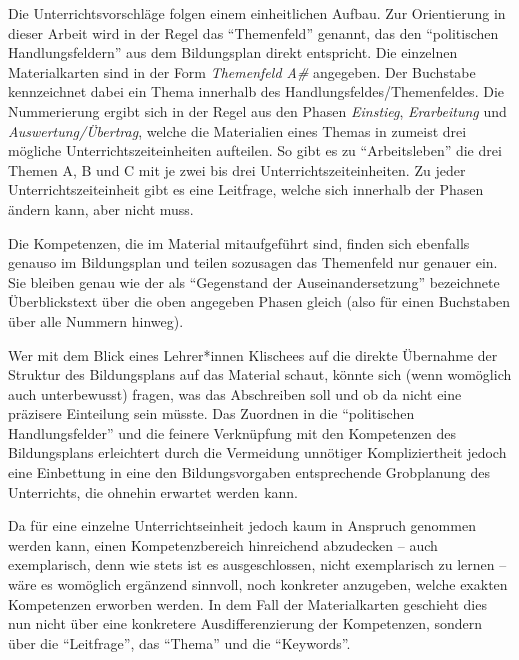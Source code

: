 Die Unterrichtsvorschläge folgen einem einheitlichen Aufbau. Zur Orientierung in dieser Arbeit wird in der Regel das \enquote{Themenfeld} genannt, das den \enquote{politischen Handlungsfeldern} aus dem Bildungsplan direkt entspricht. 
Die einzelnen Materialkarten sind in der Form \emph{Themenfeld A\#} angegeben. 
Der Buchstabe kennzeichnet dabei ein Thema innerhalb des Handlungsfeldes/Themenfeldes.
Die Nummerierung ergibt sich in der Regel aus den Phasen \emph{Einstieg}, \emph{Erarbeitung} und \emph{Auswertung/Übertrag}, welche die Materialien eines Themas in zumeist drei mögliche Unterrichtszeiteinheiten aufteilen. So gibt es zu \enquote{Arbeitsleben} die drei Themen A, B und C mit je zwei bis drei Unterrichtszeiteinheiten.
Zu jeder Unterrichtszeiteinheit gibt es eine Leitfrage, welche sich innerhalb der Phasen ändern kann, aber nicht muss. 

Die Kompetenzen, die im Material mitaufgeführt sind, finden sich ebenfalls genauso im Bildungsplan und teilen sozusagen das Themenfeld nur genauer ein. Sie bleiben genau wie der als \enquote{Gegenstand der Auseinandersetzung} bezeichnete Überblickstext über die oben angegeben Phasen gleich (also für einen Buchstaben über alle Nummern hinweg). 



Wer mit dem Blick eines Lehrer*innen Klischees auf die direkte Übernahme der Struktur des Bildungsplans auf das Material schaut, könnte sich (wenn womöglich auch unterbewusst) fragen, was das Abschreiben soll und ob da nicht eine präzisere Einteilung sein müsste.
Das Zuordnen in die \enquote{politischen Handlungsfelder} und die feinere Verknüpfung mit den Kompetenzen des Bildungsplans erleichtert durch die Vermeidung unnötiger Kompliziertheit jedoch eine Einbettung in eine den Bildungsvorgaben entsprechende Grobplanung des Unterrichts, die ohnehin erwartet werden kann.




Da für eine einzelne Unterrichtseinheit jedoch kaum in Anspruch genommen werden kann, einen Kompetenzbereich hinreichend abzudecken -- auch exemplarisch, denn wie stets ist es ausgeschlossen, nicht exemplarisch zu lernen  -- wäre es womöglich ergänzend sinnvoll, noch konkreter anzugeben, welche exakten Kompetenzen erworben werden.
In dem Fall der Materialkarten geschieht dies nun nicht über eine konkretere Ausdifferenzierung der Kompetenzen, sondern über die \enquote{Leitfrage}, das \enquote{Thema} und die \enquote{Keywords}. 


